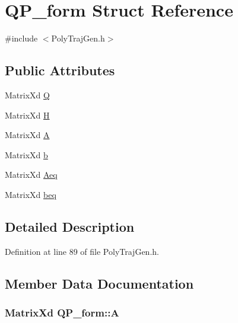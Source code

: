 \hypertarget{struct_q_p__form}{}\section{Q\+P\+\_\+form Struct Reference}
\label{struct_q_p__form}


{\ttfamily \#include $<$Poly\+Traj\+Gen.\+h$>$}

\subsection*{Public Attributes}
\begin{DoxyCompactItemize}
\item 
Matrix\+Xd \hyperlink{struct_q_p__form_a5613317ae662dd137324ee52ca52b1ae}{Q}
\item 
Matrix\+Xd \hyperlink{struct_q_p__form_ac8ff933f268484b2f78b77ffc056f11d}{H}
\item 
Matrix\+Xd \hyperlink{struct_q_p__form_afeb66f78f73f929e99f6f8afcfcc17b1}{A}
\item 
Matrix\+Xd \hyperlink{struct_q_p__form_a949cd1a76929ca7aeb61c8955da4a1a2}{b}
\item 
Matrix\+Xd \hyperlink{struct_q_p__form_af0fab4bf47d9b4a2598445bd11f446e0}{Aeq}
\item 
Matrix\+Xd \hyperlink{struct_q_p__form_a3671f01cebe0e9acdb6ce105b6eff780}{beq}
\end{DoxyCompactItemize}


\subsection{Detailed Description}


Definition at line 89 of file Poly\+Traj\+Gen.\+h.



\subsection{Member Data Documentation}
\subsubsection[{\texorpdfstring{A}{A}}]{\setlength{\rightskip}{0pt plus 5cm}Matrix\+Xd Q\+P\+\_\+form\+::A}\hypertarget{struct_q_p__form_afeb66f78f73f929e99f6f8afcfcc17b1}{}\label{struct_q_p__form_afeb66f78f73f929e99f6f8afcfcc17b1}


